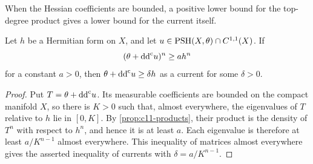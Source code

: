 When the Hessian coefficients are bounded, a positive lower bound for the top-degree product gives a lower bound for the current itself.

\begin{proposition}\label{prop:c11-ellipticity}
Let $h$ be a Hermitian form on $X$, and let $u\in\mathrm{PSH}(X,\theta)\cap C^{1,1}(X)$. If
\[
 (\theta+\mathrm{dd}^{\mathrm{c}} u)^n\geq a h^n
\]
for a constant $a>0$, then $\theta+\mathrm{dd}^{\mathrm{c}} u\geq\delta h$ as a current for some $\delta>0$.
\end{proposition}
\begin{proof}
Put $T=\theta+\mathrm{dd}^{\mathrm{c}} u$. Its measurable coefficients are bounded on the compact manifold $X$, so there is $K>0$ such that, almost everywhere, the eigenvalues of $T$ relative to $h$ lie in $[0,K]$. By \cref{prop:c11-products}, their product is the density of $T^n$ with respect to $h^n$, and hence it is at least $a$. Each eigenvalue is therefore at least $a/K^{n-1}$ almost everywhere. This inequality of matrices almost everywhere gives the asserted inequality of currents with $\delta=a/K^{n-1}$.
\end{proof}
